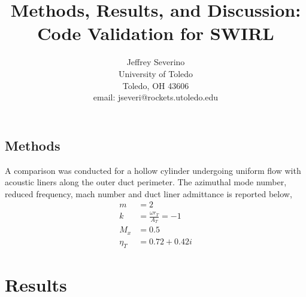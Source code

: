 \documentclass[a4paper]{article}
\begin{document}
\begin{titlepage}

    \title{
    Methods, Results, and Discussion: Code Validation for SWIRL}


    \author{ Jeffrey Severino \\
        University of Toledo \\
        Toledo, OH  43606 \\
    email: jseveri@rockets.utoledo.edu}


    \maketitle

\end{titlepage}
\subsection{Methods}
A comparison was conducted for a hollow cylinder undergoing uniform flow with
acoustic liners along the outer duct perimeter. The azimuthal mode number, reduced 
frequency, mach number and duct liner admittance is reported below,
\begin{align*}
    m &= 2 \\
    k &= \frac{\omega r_T}{A_T} = -1 \\
    M_x &= 0.5 \\
    \eta_T &= 0.72 + 0.42i
\end{align*} 
\section{Results}
\end{document}

